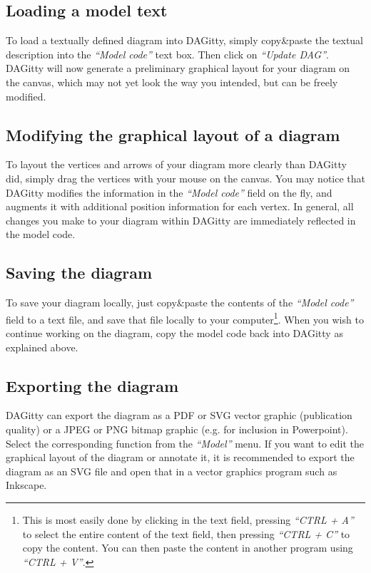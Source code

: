\documentclass[a4paper]{article} %
\newcommand{\pp}{DAGitty\xspace}
\newcommand{\action}[1]{\emph{``#1''}}
\begin{document}
\subsection{Loading a model text}

To load a textually defined diagram into \pp, simply copy\&paste the 
textual description into the \action{Model code} text
box. Then click on \action{Update DAG}.
\pp will now generate a preliminary graphical layout for your diagram on 
the canvas, which may not yet look the way you intended, but can be freely 
modified.

\subsection{Modifying the graphical layout of a diagram}

To layout the vertices and arrows of your diagram more clearly than \pp
did, simply drag the vertices with your mouse on the canvas. You may notice
that \pp modifies the information in the \action{Model code} field
on the fly, and augments it with additional position information for each
vertex. In general, all changes you make to your diagram within \pp 
are immediately reflected in the model code.

\subsection{Saving the diagram} 

To save your diagram locally, just copy\&paste the contents of the \action{Model code}
field to a text file, 
and save that file locally to your computer\footnote{This is most easily done
by clicking in the text field, pressing \action{CTRL + A} to select the entire content
of the text field, then pressing \action{CTRL + C} to copy the content. You
can then paste the content in another program using \action{CTRL + V}.}.
When you wish to continue working on the
diagram, copy the model code back into \pp as explained above. 

\subsection{Exporting the diagram}

\pp can export the diagram as a PDF or SVG vector graphic (publication quality)
or a JPEG or PNG bitmap graphic (e.g. for inclusion in Powerpoint). Select the
corresponding function from the \action{Model} menu. If you want to edit the graphical
layout of the diagram or annotate it, it is recommended to export the diagram as an
SVG file and open that in a vector graphics program such as Inkscape.
\end{document}
